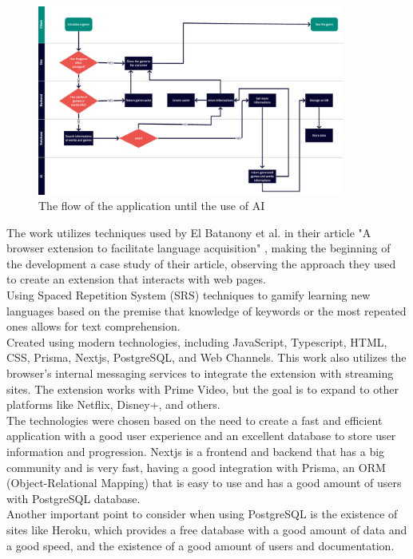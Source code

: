 \documentclass[12pt]{article}
\begin{document}
\begin{figure}[!h]
  \centering
  \caption{
    The flow of the application until the use of AI
  }
  \label{fig:flow_diagram}
  \includegraphics[width=0.9\textwidth]{assets/26.png}
\end{figure}
The work utilizes techniques used by El Batanony et al. in their article "A browser extension to facilitate language acquisition" \cite{ElBatanony21}, making the beginning of the development a case study of their article, observing the approach they used to create an extension that interacts with web pages.  \\
Using Spaced Repetition System (SRS) techniques to gamify learning new languages based on the premise that knowledge of keywords or the most repeated ones allows for text comprehension. \\
Created using modern technologies, including JavaScript, Typescript, HTML, CSS, Prisma, Nextjs, PostgreSQL, and Web Channels. This work also utilizes the browser's internal messaging services to integrate the extension with streaming sites. The extension works with Prime Video, but the goal is to expand to other platforms like Netflix, Disney+, and others. \\
The technologies were chosen based on the need to create a fast and efficient application with a good user experience and an excellent database to store user information and progression. Nextjs is a frontend and backend that has a big community and is very fast, having a good integration with Prisma, an ORM (Object-Relational Mapping) that is easy to use and has a good amount of users with PostgreSQL database. \\
Another important point to consider when using PostgreSQL is the existence of sites like Heroku, which provides a free database with a good amount of data and a good speed, and the existence of a good amount of users and documentation. \\
\end{document}
